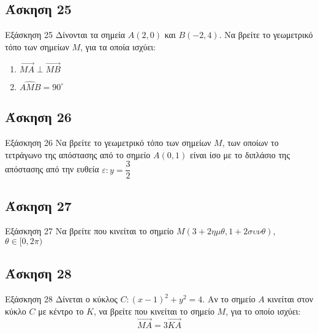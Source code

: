 \documentclass[greek]{beamer}
\begin{document}
\subsection{Άσκηση 25}
\begin{frame}[label=Άσκηση25,t]{Εξάσκηση 25}
  Δίνονται τα σημεία $Α(2,0)$ και $Β(-2,4)$. Να βρείτε το γεωμετρικό τόπο των σημείων $Μ$, για τα οποία ισχύει:
  \begin{enumerate}
    \item<1-> $\overrightarrow{ΜΑ}\perp\overrightarrow{ΜΒ}$
    \item<2-> $\widehat{ΑΜΒ}=90^{\circ}$
  \end{enumerate}

\end{frame}

\subsection{Άσκηση 26}
\begin{frame}[label=Άσκηση26,t]{Εξάσκηση 26}
  Να βρείτε το γεωμετρικό τόπο των σημείων $Μ$, των οποίων το τετράγωνο της απόστασης από το σημείο $Α(0,1)$ είναι ίσο με το διπλάσιο της απόστασης από την ευθεία $ε:y=\dfrac{3}{2}$

\end{frame}

\subsection{Άσκηση 27}
\begin{frame}[label=Άσκηση27,t]{Εξάσκηση 27}
  Να βρείτε που κινείται το σημείο $Μ(3+2ημθ,1+2συνθ)$, $θ\in [0,2π)$

\end{frame}

\subsection{Άσκηση 28}
\begin{frame}[label=Άσκηση28,t]{Εξάσκηση 28}
  Δίνεται ο κύκλος $C:(x-1)^2+y^2=4$. Αν το σημείο $Α$ κινείται στον κύκλο $C$ με κέντρο το $Κ$, να βρείτε που κινείται το σημείο $Μ$, για το οποίο ισχύει:
  $$\overrightarrow{ΜΑ}=3\overrightarrow{ΚΑ}$$

\end{frame}
\end{document}
